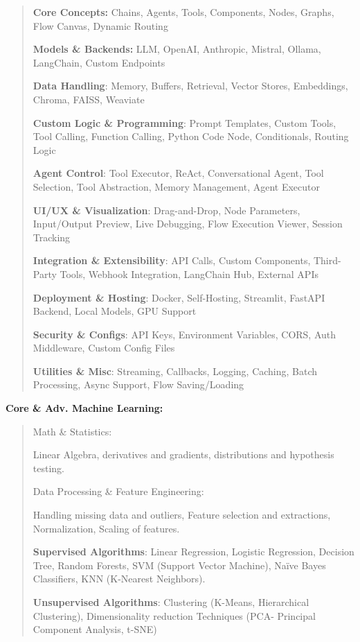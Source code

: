 \documentclass[a4paper]{article}
\begin{document}
\begin{quote}
\textbf{Core Concepts:} Chains, Agents, Tools, Components, Nodes,
Graphs, Flow Canvas, Dynamic Routing

\textbf{Models \& Backends:} LLM, OpenAI, Anthropic, Mistral, Ollama,
LangChain, Custom Endpoints

\textbf{Data Handling}: Memory, Buffers, Retrieval, Vector Stores,
Embeddings, Chroma, FAISS, Weaviate

\textbf{Custom Logic \& Programming}: Prompt Templates, Custom Tools,
Tool Calling, Function Calling, Python Code Node, Conditionals, Routing
Logic

\textbf{Agent Control}: Tool Executor, ReAct, Conversational Agent, Tool
Selection, Tool Abstraction, Memory Management, Agent Executor

\textbf{UI/UX \& Visualization}: Drag-and-Drop, Node Parameters,
Input/Output Preview, Live Debugging, Flow Execution Viewer, Session
Tracking

\textbf{Integration \& Extensibility}: API Calls, Custom Components,
Third-Party Tools, Webhook Integration, LangChain Hub, External APIs

\textbf{Deployment \& Hosting}: Docker, Self-Hosting, Streamlit, FastAPI
Backend, Local Models, GPU Support

\textbf{Security \& Configs}: API Keys, Environment Variables, CORS,
Auth Middleware, Custom Config Files

\textbf{Utilities \& Misc}: Streaming, Callbacks, Logging, Caching,
Batch Processing, Async Support, Flow Saving/Loading
\end{quote}

\textbf{Core \& Adv. Machine Learning:}

\begin{quote}
Math \& Statistics:

Linear Algebra, derivatives and gradients, distributions and hypothesis
testing.

Data Processing \& Feature Engineering:

Handling missing data and outliers, Feature selection and extractions,
Normalization, Scaling of features.

\textbf{Supervised Algorithms}: Linear Regression, Logistic Regression,
Decision Tree, Random Forests, SVM (Support Vector Machine), Naïve Bayes
Classifiers, KNN (K-Nearest Neighbors).

\textbf{Unsupervised Algorithms}: Clustering (K-Means, Hierarchical
Clustering), Dimensionality reduction Techniques (PCA- Principal
Component Analysis, t-SNE)
\end{quote}
\end{document}

